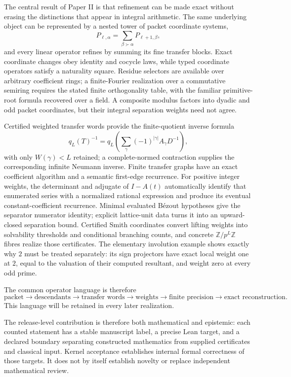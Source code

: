 \documentclass[11pt]{article}
\theoremstyle{definition}
\theoremstyle{remark}
\begin{document}
The central result of Paper II is that refinement can be made exact without erasing the distinctions that appear in integral arithmetic. The same underlying object can be represented by a nested tower of packet coordinate systems,
\[
P_{\ell,\alpha}
=
\sum_{\beta\succ\alpha}P_{\ell+1,\beta},
\]
and every linear operator refines by summing its fine transfer blocks. Exact
coordinate changes obey identity and cocycle laws, while typed coordinate
operators satisfy a naturality square. Residue selectors are available over
arbitrary coefficient rings; a finite-Fourier realization over a commutative
semiring requires the stated finite orthogonality table, with the familiar
primitive-root formula recovered over a field. A composite modulus factors
into dyadic and odd packet coordinates, but their integral separation weights
need not agree.

Certified weighted transfer words provide the finite-quotient inverse formula
\[
q_L(T)^{-1}
=q_L\!\left(\sum_\gamma
(-1)^{|\gamma|}A_\gamma D^{-1}\right),
\]
with only $W(\gamma)<L$ retained; a complete-normed contraction supplies the
corresponding infinite Neumann inverse. Finite transfer graphs have an exact
coefficient algorithm and a semantic first-edge recurrence. For positive
integer weights, the determinant and adjugate of $I-A(t)$ automatically
identify that enumerated series with a normalized rational expression and
produce its eventual constant-coefficient recurrence. Minimal evaluated
B\'ezout hypotheses give the separator numerator identity; explicit
lattice-unit data turns it into an upward-closed separation bound. Certified
Smith coordinates convert lifting weights into solvability thresholds and
conditional branching counts, and concrete $\mathbb Z/p^L\mathbb Z$ fibres
realize those certificates. The elementary involution example shows exactly
why $2$ must be treated separately: its sign projectors have exact local
weight one at $2$, equal to the valuation of their computed resultant, and
weight zero at every odd prime.

The common operator language is therefore
\[
\boxed{
\text{packet}
\to
\text{descendants}
\to
\text{transfer words}
\to
\text{weights}
\to
\text{finite precision}
\to
\text{exact reconstruction}.
}
\]
This language will be retained in every later realization.

The release-level contribution is therefore both mathematical and
epistemic: each counted statement has a stable manuscript label, a precise
Lean target, and a declared boundary separating constructed mathematics from
supplied certificates and classical input. Kernel acceptance establishes
internal formal correctness of those targets. It does not by itself establish
novelty or replace independent mathematical review.
\end{document}
